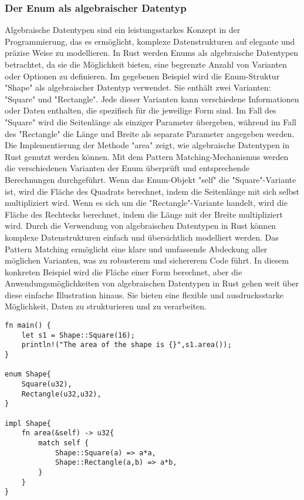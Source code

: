 \documentclass[a4paper, 1ppt]{article}
\begin{document}
\subsubsection{Der Enum als algebraischer Datentyp}
Algebraische Datentypen sind ein leistungsstarkes Konzept in der Programmierung, das es ermöglicht, komplexe Datenstrukturen auf elegante und präzise Weise zu modellieren. In Rust werden Enums als algebraische Datentypen betrachtet, da sie die Möglichkeit bieten, eine begrenzte Anzahl von Varianten oder Optionen zu definieren.
Im gegebenen Beispiel wird die Enum-Struktur "Shape" als algebraischer Datentyp verwendet. Sie enthält zwei Varianten: "Square" und "Rectangle". Jede dieser Varianten kann verschiedene Informationen oder Daten enthalten, die spezifisch für die jeweilige Form sind. Im Fall des "Square" wird die Seitenlänge als einziger Parameter übergeben, während im Fall des "Rectangle" die Länge und Breite als separate Parameter angegeben werden.
Die Implementierung der Methode "area" zeigt, wie algebraische Datentypen in Rust genutzt werden können. Mit dem Pattern Matching-Mechanismus werden die verschiedenen Varianten der Enum überprüft und entsprechende Berechnungen durchgeführt. Wenn das Enum-Objekt "self" die "Square"-Variante ist, wird die Fläche des Quadrats berechnet, indem die Seitenlänge mit sich selbst multipliziert wird. Wenn es sich um die "Rectangle"-Variante handelt, wird die Fläche des Rechtecks berechnet, indem die Länge mit der Breite multipliziert wird.
Durch die Verwendung von algebraischen Datentypen in Rust können komplexe Datenstrukturen einfach und übersichtlich modelliert werden. Das Pattern Matching ermöglicht eine klare und umfassende Abdeckung aller möglichen Varianten, was zu robusterem und sichererem Code führt. In diesem konkreten Beispiel wird die Fläche einer Form berechnet, aber die Anwendungsmöglichkeiten von algebraischen Datentypen in Rust gehen weit über diese einfache Illustration hinaus. Sie bieten eine flexible und ausdrucksstarke Möglichkeit, Daten zu strukturieren und zu verarbeiten.
\begin{verbatim}
fn main() {
    let s1 = Shape::Square(16);
    println!("The area of the shape is {}",s1.area());
}

enum Shape{
    Square(u32),
    Rectangle(u32,u32),
}

impl Shape{
    fn area(&self) -> u32{
        match self {
            Shape::Square(a) => a*a,
            Shape::Rectangle(a,b) => a*b,
        }
    }
}
\end{verbatim}
\end{document}
